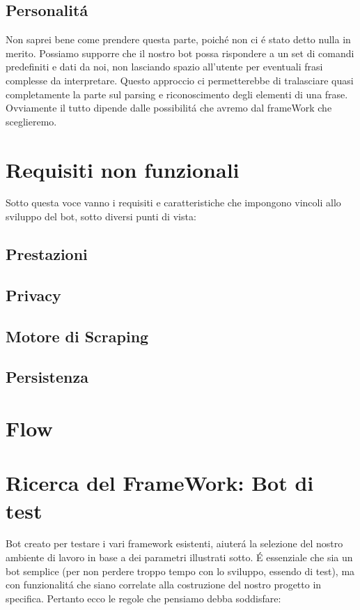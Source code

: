 \documentclass[]{article}
\begin{document}
\subsection{Personalitá}
Non saprei bene come prendere questa parte, poiché non ci é stato detto nulla in merito. Possiamo supporre che il nostro bot possa rispondere a un set di comandi predefiniti e dati da noi, non lasciando spazio all’utente per eventuali frasi complesse da interpretare. Questo approccio ci permetterebbe di tralasciare quasi completamente la parte sul parsing e riconoscimento degli elementi di una frase. Ovviamente il tutto dipende dalle possibilitá che avremo dal frameWork che sceglieremo.

\section{Requisiti non funzionali}
Sotto questa voce vanno i requisiti e caratteristiche che impongono vincoli  allo sviluppo del bot, sotto diversi punti di vista:
\subsection{Prestazioni}
\subsection{Privacy}
\subsection{Motore di Scraping}
\subsection{Persistenza}

\section{Flow}

\section{Ricerca del FrameWork: Bot di test}
Bot creato per testare i vari framework esistenti, aiuterá la selezione del nostro ambiente di lavoro in base a dei parametri illustrati sotto. É essenziale che sia un bot semplice (per non perdere troppo tempo con lo sviluppo, essendo di test), ma con funzionalitá che siano correlate alla costruzione del nostro progetto in specifica. Pertanto ecco le regole che pensiamo debba soddisfare:
\end{document}
